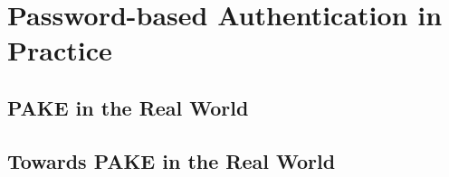 \chapter{Password-based Authentication in Practice}


\section{PAKE in the Real World}

\section{Towards PAKE in the Real World}
